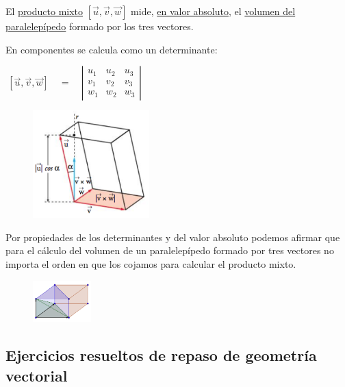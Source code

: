 \begin{multicols}{2}
El \underline{producto mixto} $[\vec u, \vec v, \vec w]$ mide, \underline{en valor absoluto}, el \underline{volumen del paralelepípedo} formado por los tres vectores.
				
En componentes se calcula como un determinante:
				
$\boxed{ \ [\overrightarrow { u } ,\overrightarrow { v }, \overrightarrow { w }]  \quad =\quad \left| \begin{matrix} u_{ 1 } & u_{ 2 } & u_{ 3 } \\ v_{ 1 } & v_{ 2 } & v_{ 3 } \\ w_{ 1 } & w_{ 2 } & w_{ 3 } \end{matrix} \right| \ } $

\begin{figure}[H]
	\centering
	\includegraphics[width=0.40\textwidth]{imagenes/imagenes10/T10IM12.png}
\end{figure}
\end{multicols}

\begin{multicols}{2}
Por propiedades de los determinantes y del valor absoluto podemos afirmar que para el cálculo del volumen de un paralelepípedo formado por tres vectores no importa el orden en que los cojamos para calcular el producto mixto.
\begin{figure}[H]
	\centering
	\includegraphics[width=0.20\textwidth]{imagenes/imagenes10/T10IM13.png}
\end{figure}
\end{multicols}


\subsection{Ejercicios resueltos de repaso de geometría vectorial}


